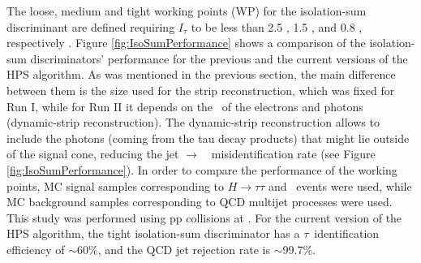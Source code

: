 \noindent The loose, medium and tight working points (WP) for the 
isolation-sum discriminant are defined requiring $I_{\tau}$ to be 
less than 2.5 \GeV, 1.5 \GeV, and 0.8 \GeV, 
respectively \cite{CMS-PAS-TAU-16-002}. Figure \ref{fig:IsoSumPerformance} shows 
a comparison of the isolation-sum discriminators' performance for 
the previous and the current versions of the HPS algorithm. As was 
mentioned in the previous section, the main difference between them is
the size used for the strip reconstruction, which was fixed for 
Run I, while for Run II it depends on the \pt~of the electrons and photons
(dynamic-strip reconstruction). The dynamic-strip reconstruction
allows to include the photons (coming from the tau decay products)
that might lie outside of the signal cone, reducing the 
jet $\rightarrow$~\tauh~misidentification rate (see Figure \ref{fig:IsoSumPerformance}). In order to
compare the performance of the working points, MC signal 
samples corresponding to $H \rightarrow \tau\tau$ and \Zprimetotautau~events were used, while 
MC background samples corresponding to QCD multijet processes were used. This study 
was performed using pp collisions at  \TeV. For the current version of the HPS algorithm,
the tight isolation-sum discriminator has a $\tau$~identification efficiency 
of $\sim$60$\%$, and the QCD jet rejection rate is  $\sim$99.7$\%$.\\

